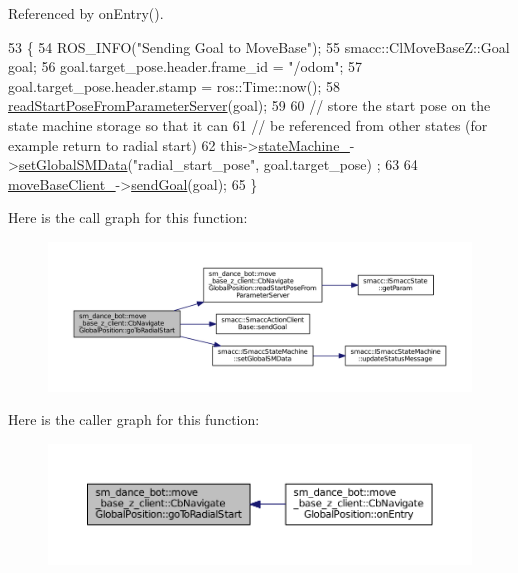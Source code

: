 Referenced by on\+Entry().


\begin{DoxyCode}
53   \{
54     ROS\_INFO(\textcolor{stringliteral}{"Sending Goal to MoveBase"});
55     smacc::ClMoveBaseZ::Goal goal;
56     goal.target\_pose.header.frame\_id = \textcolor{stringliteral}{"/odom"};
57     goal.target\_pose.header.stamp = ros::Time::now();
58     \hyperlink{classsm__dance__bot_1_1move__base__z__client_1_1CbNavigateGlobalPosition_a79dc46f7a60a0322d27ee4db0ab11ad7}{readStartPoseFromParameterServer}(goal);
59 
60     \textcolor{comment}{// store the start pose on the state machine storage so that it can}
61     \textcolor{comment}{// be referenced from other states (for example return to radial start)}
62     this->\hyperlink{classsmacc_1_1SmaccClientBehavior_a7950b5684d6de0a8e8959c0936ce9a19}{stateMachine\_}->\hyperlink{classsmacc_1_1ISmaccStateMachine_a8588f9e580fbb95b53e2bd2ca3ff1f98}{setGlobalSMData}(\textcolor{stringliteral}{"radial\_start\_pose"}, goal.target\_pose)
      ;
63 
64     \hyperlink{classsm__dance__bot_1_1move__base__z__client_1_1CbNavigateGlobalPosition_a579eaa06b93cc396b2ff615a786c495f}{moveBaseClient\_}->\hyperlink{classsmacc_1_1SmaccActionClientBase_a58c67a87c5fb8ea1633573c58fe3eee1}{sendGoal}(goal);
65   \}
\end{DoxyCode}


Here is the call graph for this function\+:
\nopagebreak
\begin{figure}[H]
\begin{center}
\leavevmode
\includegraphics[width=350pt]{classsm__dance__bot_1_1move__base__z__client_1_1CbNavigateGlobalPosition_aa7e91d17625df52b94bb29a9cd1ae7e5_cgraph}
\end{center}
\end{figure}




Here is the caller graph for this function\+:
\nopagebreak
\begin{figure}[H]
\begin{center}
\leavevmode
\includegraphics[width=350pt]{classsm__dance__bot_1_1move__base__z__client_1_1CbNavigateGlobalPosition_aa7e91d17625df52b94bb29a9cd1ae7e5_icgraph}
\end{center}
\end{figure}


